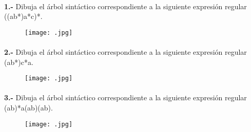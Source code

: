 \documentclass[11pt,a4paper]{report}
\begin{document}
\paragraph{}

\paragraph{}
\textbf{1.-} Dibuja el árbol sintáctico correspondiente a la siguiente expresión regular ((a\textbar b*)a*c)*. 
\begin{figure}[ht!]
\centering
\texttt{[image: .jpg]}
\end{figure}\paragraph{}
\textbf{2.-} Dibuja el árbol sintáctico correspondiente a la siguiente expresión regular (a\textbar b*)c*a. 
\begin{figure}[ht!]
\centering
\texttt{[image: .jpg]}
\end{figure}\paragraph{}
\textbf{3.-} Dibuja el árbol sintáctico correspondiente a la siguiente expresión regular (a\textbar b)*a(a\textbar b)(a\textbar b). 
\begin{figure}[ht!]
\centering
\texttt{[image: .jpg]}
\end{figure}
\end{document}
